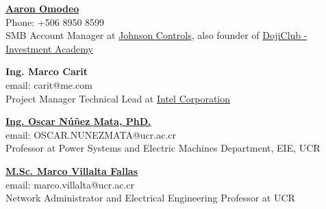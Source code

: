     \begin{tcolorbox}[ title= References \faUserFriends \hspace{0mm} , colframe=blue!25!black]

        \textbf{\href{https://www.linkedin.com/in/aaron-omodeo/}{Aaron Omodeo}}\\
        Phone: +506 8950 8599\\
        SMB Account Manager at \href{https://www.johnsoncontrols.com/}{Johnson Controls}, also founder of \href{https://www.dojiclub.com/}{DojiClub - Investment Academy}



        \tcbline
         
        \textbf{Ing. Marco Carit}\\
        email: carit@me.com\\
        Project Manager Technical Lead at \href{https://www.intel.com/content/www/us/en/corporate-responsibility/intel-in-costa-rica.html}{Intel Corporation}
        

        \tcbline

        
        \textbf{\href{https://eie.ucr.ac.cr/profesores/oscar.nunez/}{Ing. Oscar Núñez Mata, PhD.}}\\
        email: OSCAR.NUNEZMATA@ucr.ac.cr\\
        Professor at Power Systems and Electric Machines Department, EIE, UCR
        
        \tcbline
         
        \textbf{\href{https://eie.ucr.ac.cr/administrativos/marco.villalta/}{M.Sc. Marco Villalta Fallas}}\\
        email: marco.villalta@ucr.ac.cr\\
        Network Administrator and Electrical Engineering Professor at UCR

    \end{tcolorbox}
    